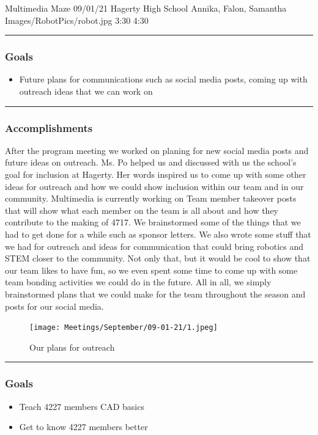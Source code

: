 \insertmeeting 
	{Multimedia Maze} 
	{09/01/21}
	{Hagerty High School}
	{Annika, Falon, Samantha}
	{Images/RobotPics/robot.jpg}
	{3:30}
  {4:30}
	
\noindent\hfil\rule{\textwidth}{.4pt}\hfil
\subsubsection*{Goals}
\begin{itemize}
    \item Future plans for communications such as social media posts, coming up with outreach ideas that we can work on
\end{itemize} 

\noindent\hfil\rule{\textwidth}{.4pt}\hfil

\subsubsection*{Accomplishments}
After the program meeting we worked on planing for new social media posts and future ideas on outreach. Ms. Po helped us and discussed with us the school’s goal for inclusion at Hagerty. Her words inspired us to come up with some other ideas for outreach and how we could show inclusion within our team and in our community. Multimedia is currently working on Team member takeover posts that will show what each member on the team is all about and how they contribute to the making of 4717. We brainstormed some of the things that we had to get done for a while such as sponsor letters. We also wrote some stuff that we had for outreach and ideas for communication that could bring robotics and STEM closer to the community. Not only that, but it would be cool to show that our team likes to have fun, so we even spent some time to come up with some team bonding activities we could do in the future. All in all, we simply brainstormed plans that we could make for the team throughout the season and posts for our social media. 


\begin{figure}[ht]
\centering
  \texttt{[image: Meetings/September/09-01-21/1.jpeg]}
  \caption{Our plans for outreach}
  \label{fig:090121_1}
\end{figure}

\noindent\hfil\rule{\textwidth}{.4pt}\hfil
\subsubsection*{Goals}
\begin{itemize}
    \item Teach 4227 members CAD basics
		\item Get to know 4227 members better

\end{itemize} 

